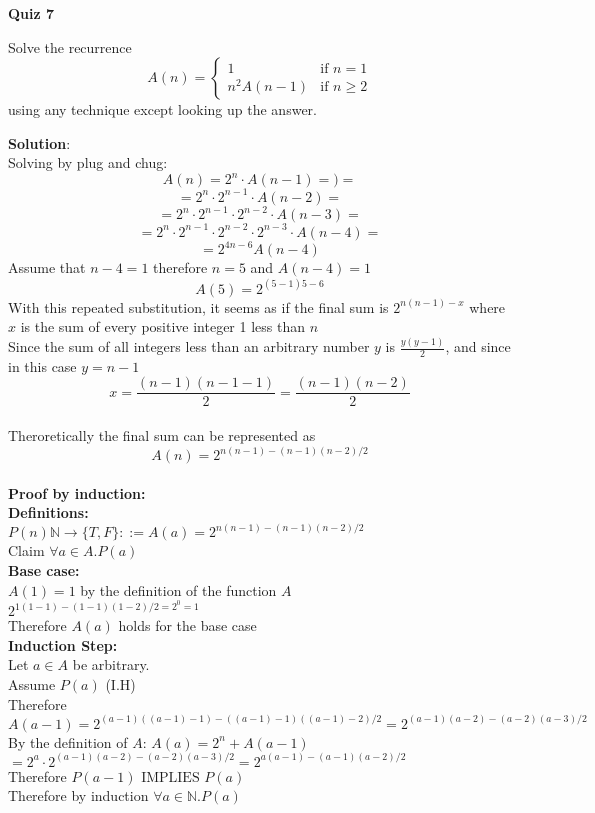 \documentclass[11pt]{article}
\def\nats {{\mathbb N}}
\newcommand{\Implies}{\mbox{ IMPLIES }}
\begin{document}
{\bf \large Quiz 7}

\medskip

\begin{question}
Solve the recurrence
$$A(n) = \left \{
\begin{array}{ll}
1 & \mbox{if } n = 1\\
n^2A(n-1)  & \mbox{if } n \geq 2
\end{array} \right .$$
using any technique except looking up the answer.
\end{question}

\begin{solution}
{\bf Solution}:\\
Solving by plug and chug:\\
$$A(n)= 2^n \cdot A(n-1)=)=$$
$$=2^n \cdot 2^{n-1} \cdot A(n-2) =$$
$$=2^n \cdot 2^{n-1} \cdot 2^{n-2} \cdot A(n-3)= $$
$$=2^n \cdot 2^{n-1} \cdot 2^{n-2} \cdot 2^{n-3} \cdot A(n-4)= $$
$$= 2^{4n-6} A(n-4)$$
Assume that $n-4 =1$ therefore $n=5$ and $A(n-4) = 1$\\
$$ A(5)= 2^{(5-1)5-6}$$
With this repeated substitution, it seems as if the final sum is $2^{n(n-1) - x}$ where $x$ is the sum of every positive integer 1 less than $n$\\
Since the sum of all integers less than an arbitrary number $y$ is $\frac{y(y-1)}2$, and since in this case $y=n-1$\\
$$x = \frac{(n-1)(n-1-1)}2 =  \frac{(n-1)(n-2)}2$$\\
Theroretically the final sum can be represented as \\
$$ A(n) = 2^{n(n-1) - (n-1)(n-2)/2}$$\\
{\bf Proof by induction:}\\
{\bf Definitions:}\\
$P(n) \nats\rightarrow \{T,F\} ::= A(a) = 2^{n(n-1) - (n-1)(n-2)/2} $\\
Claim $\forall a\in A. P(a)$\\
{\bf Base case: }\\
$A(1) =1 $ by the definition of the function $A$\\
$2^{1(1-1) - (1-1)(1-2)/2 = 2^0 = 1}$\\
Therefore $A(a)$ holds for the base case\\
{\bf Induction Step:}\\
\null\quad Let $a\in A$ be arbitrary.\\
\null\qquad Assume $P(a)$ (I.H)\\
\null\qquad Therefore $A(a-1) = 2^{(a-1)((a-1)-1) - ((a-1)-1)((a-1)-2)/2} = 2^{(a-1)(a-2) - (a-2)(a-3)/2}$\\
\null\qquad By the definition of $A$: $A(a) = 2^n + A(a-1)$\\
\null\qquad $=2^a \cdot 2^{(a-1)(a-2) - (a-2)(a-3)/2}  =2^{a(a-1) - (a-1)(a-2)/2}  $\\
\null\quad Therefore $P(a-1) \Implies P(a)$\\
Therefore by induction $\forall a\in \nats.P(a)$\\

\end{solution}
\end{document}
